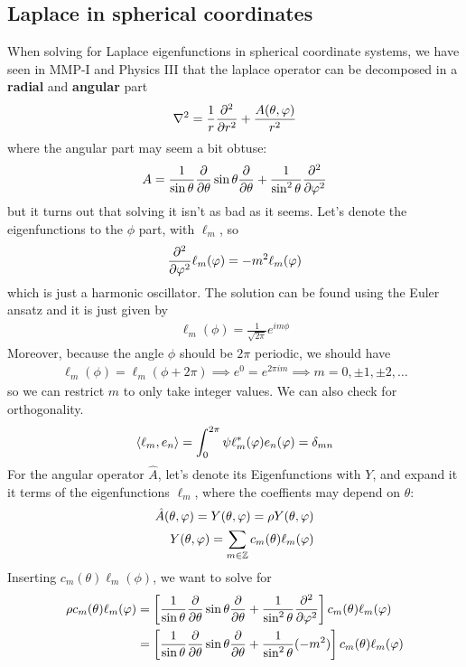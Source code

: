 
\subsection{Laplace in spherical coordinates}
When solving for Laplace eigenfunctions in spherical coordinate systems, we have seen in MMP-I and Physics III that the laplace operator can be decomposed in a \textbf{radial} and \textbf{angular} part
\begin{align*}
  \nabla^{2} = \frac{1}{r} \frac{\partial^{2} }{\partial r^{2}} + \frac{A(\theta,\varphi)}{r^{2}}
\end{align*}
where the angular part may seem a bit obtuse:
\begin{align*}
  A = \frac{1}{\sin \theta} \frac{\partial }{\partial \theta} \sin \theta \frac{\partial }{\partial \theta} + \frac{1}{\sin^{2} \theta} \frac{\partial^{2} }{\partial \varphi^{2}}
\end{align*}
but it turns out that solving it isn't as bad as it seems.
Let's denote the eigenfunctions to the $\phi$ part, with $\ell_m$, so
\begin{align*}
  \frac{\partial^{2}}{\partial \varphi^{2}}\ell_m(\varphi) = - m^{2} \ell_m(\varphi)
\end{align*}
which is just a harmonic oscillator. The solution can be found using the Euler ansatz and it is just given by
\begin{align*}
  \ell_m(\phi) = \frac{1}{\sqrt{2 \pi}} e^{im \phi}
\end{align*}
Moreover, because the angle $\phi$ should be $2 \pi$ periodic, we should have
\begin{align*}
  \ell_m(\phi) = \ell_m(\phi + 2 \pi) \implies e^{0} = e^{2 \pi i m} \implies m = 0, \pm 1, \pm 2, \ldots
\end{align*}
so we can restrict $m$ to only take integer values.
We can also check for orthogonality.
\begin{align*}
  \langle\ell_m,e_n\rangle = \int_0^{2 \pi}\psi \ell_m^{\ast}(\varphi) e_n(\varphi) = \delta_{mn}
\end{align*}
For the angular operator $\hat{A}$, let's denote its Eigenfunctions with $Y$, and expand it it terms of the eigenfunctions $\ell_m$, where the coeffients may depend on $\theta$:
\begin{align*}
  \hat{A}(\theta,\varphi) = Y(\theta,\varphi) = \rho Y(\theta,\varphi)\\
  Y(\theta,\varphi) = \sum_{m \in \mathbb{Z}}c_m(\theta) \ell_m(\varphi)
\end{align*}
Inserting $c_m(\theta)\ell_m(\phi)$, we want to solve for
\begin{align*}
  \rho c_m(\theta) \ell_m(\varphi)
  &=
  \left[
    \frac{1}{\sin \theta} \frac{\partial }{\partial \theta} \sin \theta \frac{\partial }{\partial \theta} + \frac{1}{\sin^{2} \theta} \frac{\partial^2}{\partial \varphi^{2}}
\right]
c_m(\theta) \ell_m(\varphi)
\\
  &=
  \left[
    \frac{1}{\sin \theta} \frac{\partial }{\partial \theta} \sin \theta \frac{\partial }{\partial \theta} + \frac{1}{\sin^{2} \theta} (-m^{2})
  \right]
c_m(\theta) \ell_m(\varphi)
\end{align*}
